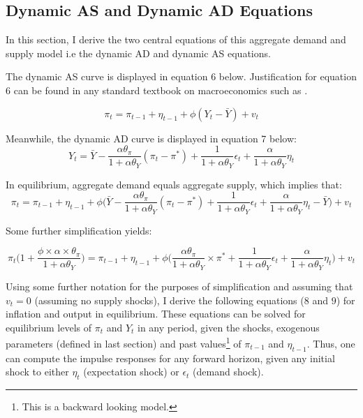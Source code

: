 \documentclass[12pt]{article}
\newcommand{\1}{\mathbbm 1}
\begin{document}
		\subsection{Dynamic AS and Dynamic AD Equations}
		
		In this section, I derive the two central equations of this aggregate demand and supply model i.e the dynamic AD and dynamic AS equations. 
		
		The dynamic AS curve is displayed in equation 6 below. Justification for equation 6 can be found in any standard textbook on macroeconomics such as \cite{abel2017macroeconomics}.
		
			\begin{equation}
			\pi_{t} = \pi_{t-1} + \eta_{t-1} + \phi (Y_{t} - \bar{Y}) + v_{t}
		\end{equation}
	
	Meanwhile, the dynamic AD curve is displayed in equation 7 below:
		\begin{equation}
		Y_{t} = \bar{Y} - \frac{\alpha \theta_{\pi}}{1 + \alpha \theta_{Y}}(\pi_{t} - \pi^{*}) + \frac{1}{1 + \alpha \theta_{Y}} \epsilon_{t} + \frac{\alpha}{1 + \alpha \theta_{Y}} \eta_{t}
	\end{equation}

In equilibrium, aggregate demand equals aggregate supply, which implies that:
\begin{equation*}
\pi_{t} = \pi_{t-1} + \eta_{t-1} + \phi\bigg(\bar{Y} - \frac{\alpha \theta_{\pi}}{1 + \alpha \theta_{Y}}(\pi_{t} - \pi^{*}) + \frac{1}{1 + \alpha \theta_{Y}} \epsilon_{t} + \frac{\alpha}{1 + \alpha \theta_{Y}} \eta_{t} - \bar{Y}\bigg) + v_{t}
\end{equation*}

Some further simplification yields:

\begin{equation*}
	\pi_{t}\bigg(1 +  \frac{\phi \times \alpha \times \theta_{\pi}}{1 + \alpha \theta_{Y}}\bigg)  = \pi_{t-1} + \eta_{t-1} + \phi\bigg(\frac{\alpha \theta_{\pi}}{1 + \alpha \theta_{Y}} \times \pi^{*} + \frac{1}{1 + \alpha \theta_{Y}} \epsilon_{t} + \frac{\alpha}{1 + \alpha \theta_{Y}} \eta_{t} \bigg) + v_{t}
\end{equation*}

Using some further notation for the purposes of simplification and assuming that $v_{t} = 0$ (assuming no supply shocks), I derive the following equations ($8$ and $9$) for inflation and output in equilibrium. These equations can be solved for equilibrium levels of $\pi_{t}$ and $Y_{t}$ in any period, given the shocks, exogenous parameters (defined in last section) and past values\footnote{This is a backward looking model.} of $\pi_{t-1}$ and $\eta_{t-1}$. Thus, one can compute the impulse responses for any forward horizon, given any initial shock to either $\eta_{t}$ (expectation shock) or $\epsilon_{t}$ (demand shock). 
\end{document}
